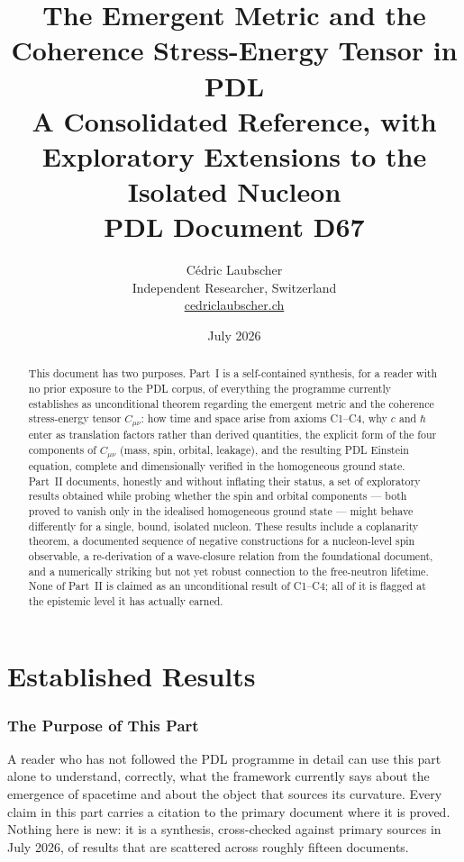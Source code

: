 \documentclass[11pt,a4paper]{article}
\title{\textbf{The Emergent Metric and the Coherence Stress-Energy Tensor in PDL}\texorpdfstring{\\[4pt]\large A Consolidated Reference, with Exploratory Extensions to the Isolated Nucleon}{: A Consolidated Reference, with Exploratory Extensions to the Isolated Nucleon}\\[6pt]
{\large PDL Document D67}}
\author{C\'edric Laubscher\\[4pt]
\small Independent Researcher, Switzerland\\
\small \href{https://cedriclaubscher.ch}{cedriclaubscher.ch}}
\date{July 2026}
\newcommand{\Ccoh}{C_{\mu\nu}}
\begin{document}
\maketitle

\begin{abstract}
This document has two purposes. Part~I is a self-contained synthesis, for a reader with no prior exposure to the PDL corpus, of everything the programme currently establishes as unconditional theorem regarding the emergent metric and the coherence stress-energy tensor $\Ccoh$: how time and space arise from axioms C1--C4, why $c$ and $\hbar$ enter as translation factors rather than derived quantities, the explicit form of the four components of $\Ccoh$ (mass, spin, orbital, leakage), and the resulting PDL Einstein equation, complete and dimensionally verified in the homogeneous ground state. Part~II documents, honestly and without inflating their status, a set of exploratory results obtained while probing whether the spin and orbital components --- both proved to vanish only in the idealised homogeneous ground state --- might behave differently for a single, bound, isolated nucleon. These results include a coplanarity theorem, a documented sequence of negative constructions for a nucleon-level spin observable, a re-derivation of a wave-closure relation from the foundational document, and a numerically striking but not yet robust connection to the free-neutron lifetime. None of Part~II is claimed as an unconditional result of C1--C4; all of it is flagged at the epistemic level it has actually earned.
\end{abstract}

\clearpage
 
\tableofcontents

\clearpage

\part{Established Results}

\section{\texorpdfstring{The Purpose of This Part}{The Purpose of This Part}}

A reader who has not followed the PDL programme in detail can use this part alone to understand, correctly, what the framework currently says about the emergence of spacetime and about the object that sources its curvature. Every claim in this part carries a citation to the primary document where it is proved. Nothing here is new: it is a synthesis, cross-checked against primary sources in July 2026, of results that are scattered across roughly fifteen documents.
\end{document}
